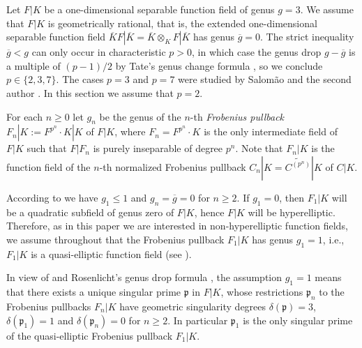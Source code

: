 \documentclass[12pt,reqno]{amsart}
\theoremstyle{definition}
\newcommand{\wt}{\widetilde}
\newcommand{\ov}{\overline}
\newcommand{\pp}{\mathfrak{p}}
\newcommand{\de}{\delta}
\begin{document}
Let $F|K$ be a one-dimensional separable function field of genus $g=3$.
We assume that $F|K$ is geometrically rational, that is, the extended one-dimensional separable function field $\ov K F | \ov K = \ov K \otimes_K F | \ov K$ has genus $\ov g = 0$. 
The strict inequality $\ov g < g$ can only occur in characteristic $p>0$, in which case the genus drop $g - \ov g$ is a multiple of $(p-1)/2$ by Tate's genus change formula \cite{Tate52}, so we conclude $p\in \{ 2,3,7 \}$.
The cases $p=3$ and $p=7$ were studied by Salomão \cite{Sal11,Sal14} and the second author \cite{St04}.
In this section we assume that $p=2$.

For each $n \geq 0$ let $g_n$ be the genus of the $n$-th \emph{Frobenius pullback} $F_n|K := F^{p^n}{\cdot}K|K$ of $F|K$, where $F_n = F^{p^n}{\cdot}K$ is the only intermediate field of $F|K$ such that $F|F_n$ is purely inseparable of degree $p^n$.
Note that $F_n|K$ is the function field of the $n$-th normalized Frobenius pullback $C_n|K = \wt{C^{(p^n)}}|K$ of $C|K$.


According to \cite[Corollary~2.7~(iii)]{HiSt22} we have $g_1 \leq 1$ and $g_n = \ov g = 0$ for $n\geq 2$.
If $g_1=0$, then $F_1|K$ will be a quadratic subfield of genus zero of $F|K$, hence $F|K$ will be hyperelliptic.
Therefore, as in this paper we are interested in non-hyperelliptic function fields, we assume throughout that the Frobenius pullback $F_1|K$ has genus $g_1=1$, i.e., $F_1|K$ is a quasi-elliptic function field (see \cite[Section~2]{HiSt23}).

In view of \cite[Proposition~2.4]{HiSt22} and Rosenlicht's genus drop formula \cite[Formula~2.3]{HiSt22}, the assumption $g_1=1$ means that there exists a unique singular prime $\pp$ in $F|K$,
whose restrictions $\pp_n$ to the Frobenius pullbacks $F_n|K$ have geometric singularity degrees $\de(\pp) = 3$, $\de(\pp_1)=1$ and $\de(\pp_n)=0$ for $n\geq2$.
In particular $\pp_1$ is the only singular prime of the quasi-elliptic Frobenius pullback $F_1|K$.
\end{document}
